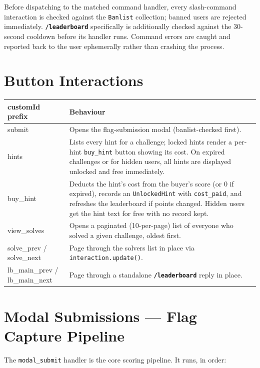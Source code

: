 \documentclass[12pt,a4paper]{report}
\newcommand{\cmd}[1]{\texttt{\color{cybercyan}\textbf{#1}}}
\begin{document}
Before dispatching to the matched command handler, every slash-command interaction is checked
against the \texttt{Banlist} collection; banned users are rejected immediately. \cmd{/leaderboard}
specifically is additionally checked against the 30-second cooldown before its handler runs.
Command errors are caught and reported back to the user ephemerally rather than crashing the
process.

\section{Button Interactions}

\begin{center}
\begin{tabular}{>{\ttfamily}l p{9.5cm}}
\toprule
\textbf{customId prefix} & \textbf{Behaviour} \\
\midrule
submit          & Opens the flag-submission modal (banlist-checked first). \\
hints           & Lists every hint for a challenge; locked hints render a per-hint \texttt{buy\_hint} button showing its cost. On expired challenges or for hidden users, all hints are displayed unlocked and free immediately. \\
buy\_hint        & Deducts the hint's cost from the buyer's score (or 0 if expired), records an \texttt{UnlockedHint} with \texttt{cost\_paid}, and refreshes the leaderboard if points changed. Hidden users get the hint text for free with no record kept. \\
view\_solves     & Opens a paginated (10-per-page) list of everyone who solved a given challenge, oldest first. \\
solve\_prev / solve\_next & Page through the solvers list in place via \texttt{interaction.update()}. \\
lb\_main\_prev / lb\_main\_next & Page through a standalone \cmd{/leaderboard} reply in place. \\
\bottomrule
\end{tabular}
\end{center}

\section{Modal Submissions --- Flag Capture Pipeline}

The \texttt{modal\_submit} handler is the core scoring pipeline. It runs, in order:
\end{document}
